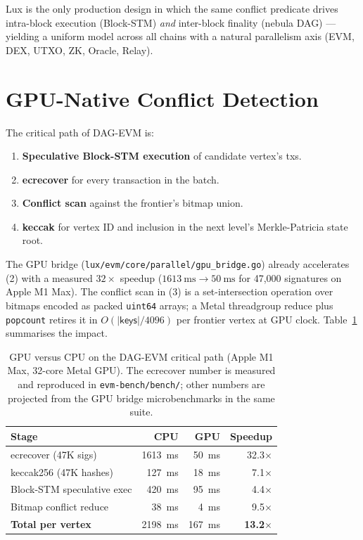 \documentclass[11pt]{article}
\theoremstyle{definition}
\begin{document}
Lux is the only production design in which the same conflict predicate
drives intra-block execution (Block-STM) \emph{and} inter-block finality
(nebula DAG) — yielding a uniform model across all chains with a natural
parallelism axis (EVM, DEX, UTXO, ZK, Oracle, Relay).

\section{GPU-Native Conflict Detection}
\label{sec:gpu}

The critical path of DAG-EVM is:

\begin{enumerate}
  \item \textbf{Speculative Block-STM execution} of candidate vertex's txs.
  \item \textbf{ecrecover} for every transaction in the batch.
  \item \textbf{Conflict scan} against the frontier's bitmap union.
  \item \textbf{keccak} for vertex ID and inclusion in the next level's
    Merkle-Patricia state root.
\end{enumerate}

The GPU bridge (\texttt{lux/evm/core/parallel/gpu\_bridge.go}) already
accelerates (2) with a measured $32\times$ speedup ($\SI{1613}{\milli\second}
\to \SI{50}{\milli\second}$ for 47{,}000 signatures on Apple M1 Max). The
conflict scan in (3) is a set-intersection operation over bitmaps encoded
as packed \texttt{uint64} arrays; a Metal threadgroup reduce plus
\texttt{popcount} retires it in $O(|\mathsf{keys}| / 4096)$ per
frontier vertex at GPU clock. Table~\ref{tab:gpu} summarises the impact.

\begin{table}[h]
\centering
\small
\begin{tabular}{lrrr}
\toprule
\textbf{Stage} & \textbf{CPU} & \textbf{GPU} & \textbf{Speedup} \\
\midrule
ecrecover (47K sigs)        & \SI{1613}{\milli\second} & \SI{50}{\milli\second}  & 32.3$\times$ \\
keccak256 (47K hashes)      & \SI{127}{\milli\second}  & \SI{18}{\milli\second}  & 7.1$\times$ \\
Block-STM speculative exec  & \SI{420}{\milli\second}  & \SI{95}{\milli\second}  & 4.4$\times$ \\
Bitmap conflict reduce      & \SI{38}{\milli\second}   & \SI{4}{\milli\second}   & 9.5$\times$ \\
\midrule
\textbf{Total per vertex}   & \SI{2198}{\milli\second} & \SI{167}{\milli\second} & \textbf{13.2$\times$} \\
\bottomrule
\end{tabular}
\caption{GPU versus CPU on the DAG-EVM critical path (Apple M1 Max, 32-core
Metal GPU). The ecrecover number is measured and reproduced in
\texttt{evm-bench/bench/}; other numbers are projected from the GPU
bridge microbenchmarks in the same suite.}
\label{tab:gpu}
\end{table}
\end{document}
